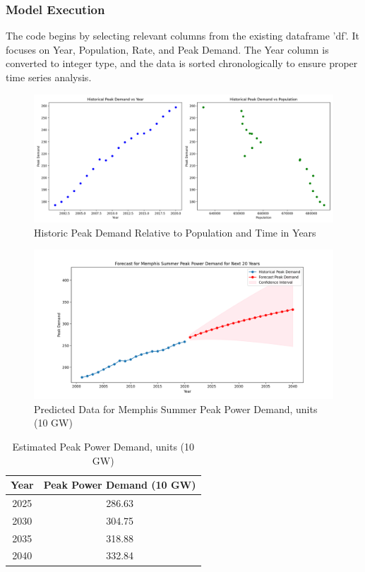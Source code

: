 \documentclass[12pt]{article}
\begin{document}
\subsubsection{Model Execution}
The code begins by selecting relevant columns from the existing dataframe 'df'. It focuses on Year, Population, Rate, and Peak Demand. The Year column is converted to integer type, and the data is sorted chronologically to ensure proper time series analysis.



\begin{figure}[H]
  \centering
  \includegraphics[scale=.5]{Historical data memphis.png} 
  \caption{Historic Peak Demand Relative to Population and Time in Years}
  \label{fig:correlation_matrix}
\end{figure}



\begin{figure}[H]
  \centering
  \includegraphics[scale=.5]{Memphis Prediction 20 Years.png} 
  \caption{Predicted Data for Memphis Summer Peak Power Demand, units (10 GW)}
  \label{fig:correlation_matrix}
\end{figure}

\begin{table}[ht]
\centering
\begin{tabular}{|c|c|}
\hline
\textbf{Year} & \textbf{Peak Power Demand (10 GW)} \\
\hline
2025 & 286.63 \\
2030 & 304.75 \\
2035 & 318.88 \\
2040 & 332.84 \\
\hline
\end{tabular}
\caption{Estimated Peak Power Demand, units (10 GW)}
\label{tab:peak_power_demand}
\end{table}
\end{document}
